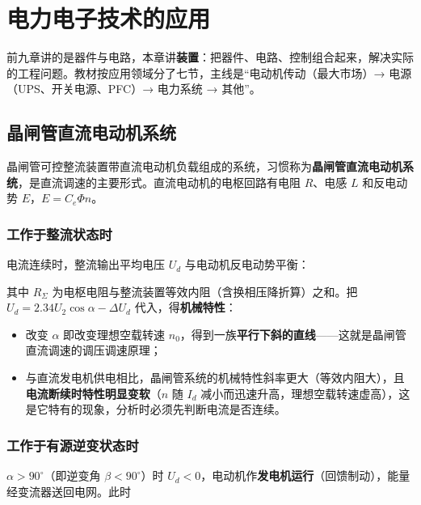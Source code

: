 \chapter{电力电子技术的应用}

前九章讲的是器件与电路，本章讲\textbf{装置}：把器件、电路、控制组合起来，解决实际的工程问题。教材按应用领域分了七节，主线是“电动机传动（最大市场）→ 电源（UPS、开关电源、PFC）→ 电力系统 → 其他”。

\section{晶闸管直流电动机系统}

晶闸管可控整流装置带直流电动机负载组成的系统，习惯称为\textbf{晶闸管直流电动机系统}，是直流调速的主要形式。直流电动机的电枢回路有电阻 $R$、电感 $L$ 和反电动势 $E$，$E=C_e\Phi n$。

\subsection{工作于整流状态时}

电流连续时，整流输出平均电压 $U_d$ 与电动机反电动势平衡：


其中 $R_\Sigma$ 为电枢电阻与整流装置等效内阻（含换相压降折算）之和。把 $U_d=2.34U_2\cos\alpha-\Delta U_d$ 代入，得\textbf{机械特性}：


\begin{itemize}
  \item 改变 $\alpha$ 即改变理想空载转速 $n_0$，得到一族\textbf{平行下斜的直线}——这就是晶闸管直流调速的调压调速原理；
  \item 与直流发电机供电相比，晶闸管系统的机械特性斜率更大（等效内阻大），且\textbf{电流断续时特性明显变软}（$n$ 随 $I_d$ 减小而迅速升高，理想空载转速虚高），这是它特有的现象，分析时必须先判断电流是否连续。
\end{itemize}

\subsection{工作于有源逆变状态时}

$\alpha>90^\circ$（即逆变角 $\beta<90^\circ$）时 $U_d<0$，电动机作\textbf{发电机运行}（回馈制动），能量经变流器送回电网。此时

